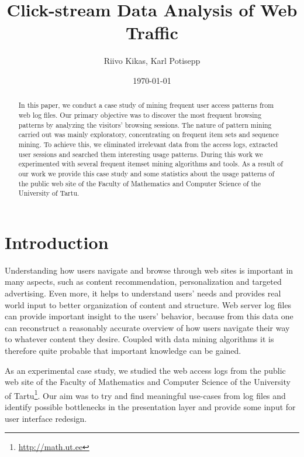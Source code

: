 \documentclass[12pt, english,a4paper]{article}
\begin{document}
\title{Click-stream Data Analysis of Web Traffic}
\author{Riivo Kikas, Karl Potisepp}
\date{\today}
\maketitle


\begin{abstract}
In this paper, we conduct a case study of mining frequent user access patterns from web log files. Our primary objective was to discover the most frequent browsing patterns by analyzing the visitors' browsing sessions. The nature of pattern mining carried out was mainly exploratory, concentrating on frequent item sets and sequence mining. To achieve this, we eliminated irrelevant data from the access logs, extracted user sessions and searched them interesting usage patterns. During this work we experimented with several frequent itemset mining algorithms and tools. As a result of our work we provide this case study and some statistics about the usage patterns of the public web site of the Faculty of Mathematics and Computer Science of the University of Tartu.
\end{abstract}


\tableofcontents


\section{Introduction} 
Understanding how users navigate and browse through web sites is important in many aspects, such as content recommendation,
personalization and targeted advertising. Even more, it helps to understand users' needs and provides real world input to better organization of content and structure. Web server log files can provide important insight to the users' behavior, because from this data one can reconstruct a reasonably accurate overview of how users navigate their way to whatever content they desire. Coupled with data mining algorithms it is therefore quite probable that important knowledge can be gained.

As an experimental case study, we studied the web access logs from the public web site of the Faculty of Mathematics and Computer Science of the University of Tartu\footnote{\url{http://math.ut.ee}}. Our aim was to try and find meaningful use-cases from log files and identify possible bottlenecks in the presentation layer and provide some input for user interface redesign.
\end{document}
